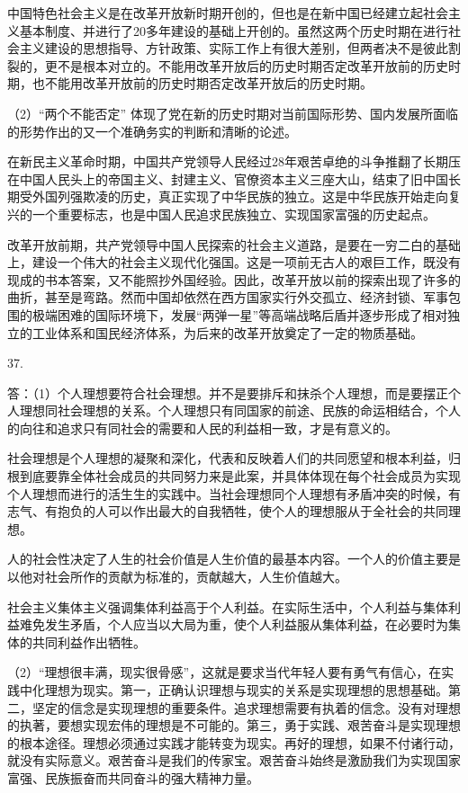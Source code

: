\documentclass[a4paper]{article}
\begin{document}
中国特色社会主义是在改革开放新时期开创的，但也是在新中国已经建立起社会主义基本制度、并进行了20多年建设的基础上开创的。虽然这两个历史时期在进行社会主义建设的思想指导、方针政策、实际工作上有很大差别，但两者决不是彼此割裂的，更不是根本对立的。不能用改革开放后的历史时期否定改革开放前的历史时期，也不能用改革开放前的历史时期否定改革开放后的历史时期。

（2）“两个不能否定” 体现了党在新的历史时期对当前国际形势、国内发展所面临的形势作出的又一个准确务实的判断和清晰的论述。

在新民主义革命时期，中国共产党领导人民经过28年艰苦卓绝的斗争推翻了长期压在中国人民头上的帝国主义、封建主义、官僚资本主义三座大山，结束了旧中国长期受外国列强欺凌的历史，真正实现了中华民族的独立。这是中华民族开始走向复兴的一个重要标志，也是中国人民追求民族独立、实现国家富强的历史起点。

改革开放前期，共产党领导中国人民探索的社会主义道路，是要在一穷二白的基础上，建设一个伟大的社会主义现代化强国。这是一项前无古人的艰巨工作，既没有现成的书本答案，又不能照抄外国经验。因此，改革开放以前的探索出现了许多的曲折，甚至是弯路。然而中国却依然在西方国家实行外交孤立、经济封锁、军事包围的极端困难的国际环境下，发展“两弹一星”等高端战略后盾并逐步形成了相对独立的工业体系和国民经济体系，为后来的改革开放奠定了一定的物质基础。

37.

答：（1）个人理想要符合社会理想。并不是要排斥和抹杀个人理想，而是要摆正个人理想同社会理想的关系。个人理想只有同国家的前途、民族的命运相结合，个人的向往和追求只有同社会的需要和人民的利益相一致，才是有意义的。

社会理想是个人理想的凝聚和深化，代表和反映着人们的共同愿望和根本利益，归根到底要靠全体社会成员的共同努力来是此案，并具体体现在每个社会成员为实现个人理想而进行的活生生的实践中。当社会理想同个人理想有矛盾冲突的时候，有志气、有抱负的人可以作出最大的自我牺牲，使个人的理想服从于全社会的共同理想。

人的社会性决定了人生的社会价值是人生价值的最基本内容。一个人的价值主要是以他对社会所作的贡献为标准的，贡献越大，人生价值越大。

社会主义集体主义强调集体利益高于个人利益。在实际生活中，个人利益与集体利益难免发生矛盾，个人应当以大局为重，使个人利益服从集体利益，在必要时为集体的共同利益作出牺牲。

（2）“理想很丰满，现实很骨感”，这就是要求当代年轻人要有勇气有信心，在实践中化理想为现实。第一，正确认识理想与现实的关系是实现理想的思想基础。第二，坚定的信念是实现理想的重要条件。追求理想需要有执着的信念。没有对理想的执著，要想实现宏伟的理想是不可能的。第三，勇于实践、艰苦奋斗是实现理想的根本途径。理想必须通过实践才能转变为现实。再好的理想，如果不付诸行动，就没有实际意义。艰苦奋斗是我们的传家宝。艰苦奋斗始终是激励我们为实现国家富强、民族振奋而共同奋斗的强大精神力量。
\end{document}
